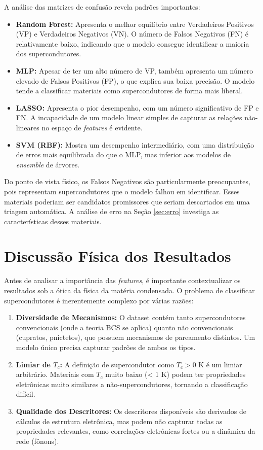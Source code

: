 \documentclass[12pt, a4paper, oneside]{report}
\begin{document}
A análise das matrizes de confusão revela padrões importantes:

\begin{itemize}
    \item \textbf{Random Forest:} Apresenta o melhor equilíbrio entre Verdadeiros Positivos (VP) e Verdadeiros Negativos (VN). O número de Falsos Negativos (FN) é relativamente baixo, indicando que o modelo consegue identificar a maioria dos supercondutores.
    \item \textbf{MLP:} Apesar de ter um alto número de VP, também apresenta um número elevado de Falsos Positivos (FP), o que explica sua baixa precisão. O modelo tende a classificar materiais como supercondutores de forma mais liberal.
    \item \textbf{LASSO:} Apresenta o pior desempenho, com um número significativo de FP e FN. A incapacidade de um modelo linear simples de capturar as relações não-lineares no espaço de \textit{features} é evidente.
    \item \textbf{SVM (RBF):} Mostra um desempenho intermediário, com uma distribuição de erros mais equilibrada do que o MLP, mas inferior aos modelos de \textit{ensemble} de árvores.
\end{itemize}

Do ponto de vista físico, os Falsos Negativos são particularmente preocupantes, pois representam supercondutores que o modelo falhou em identificar. Esses materiais poderiam ser candidatos promissores que seriam descartados em uma triagem automática. A análise de erro na Seção \ref{sec:erro} investiga as características desses materiais.

\section{Discussão Física dos Resultados}

Antes de analisar a importância das \textit{features}, é importante contextualizar os resultados sob a ótica da física da matéria condensada. O problema de classificar supercondutores é inerentemente complexo por várias razões:

\begin{enumerate}
    \item \textbf{Diversidade de Mecanismos:} O dataset contém tanto supercondutores convencionais (onde a teoria BCS se aplica) quanto não convencionais (cupratos, pnictetos), que possuem mecanismos de pareamento distintos. Um modelo único precisa capturar padrões de ambos os tipos.
    \item \textbf{Limiar de $T_c$:} A definição de supercondutor como $T_c > 0$ K é um limiar arbitrário. Materiais com $T_c$ muito baixo (< 1 K) podem ter propriedades eletrônicas muito similares a não-supercondutores, tornando a classificação difícil.
    \item \textbf{Qualidade dos Descritores:} Os descritores disponíveis são derivados de cálculos de estrutura eletrônica, mas podem não capturar todas as propriedades relevantes, como correlações eletrônicas fortes ou a dinâmica da rede (fônons).
\end{enumerate}
\end{document}
